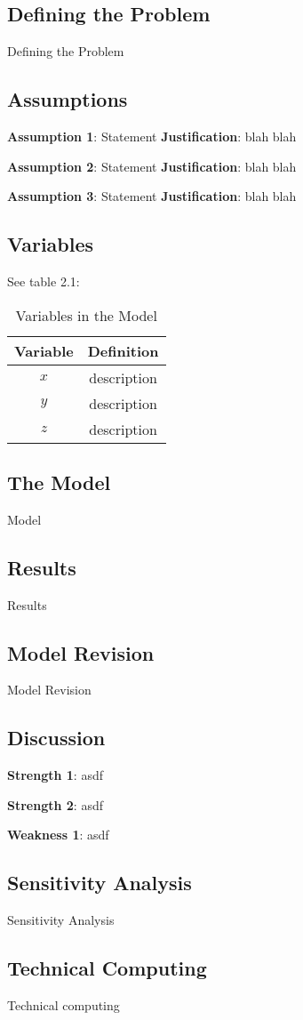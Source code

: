 \subsection{Defining the Problem}
Defining the Problem

\subsection{Assumptions}
\noindent\textbf{Assumption 1}: Statement
\textbf{Justification}: blah blah

\noindent\textbf{Assumption 2}: Statement
\textbf{Justification}: blah blah

\noindent\textbf{Assumption 3}: Statement
\textbf{Justification}: blah blah

\subsection{Variables}
See table 2.1:
\begin{table}[h!]
    \centering
    \begin{tabular}{cc}
        \toprule
        Variable & Definition      \\
        \midrule
        $x$      & description     \\
        $y$      & description     \\
        $z$      & description     \\
        \bottomrule
    \end{tabular}
    \caption{Variables in the Model}
    \label{tab:my_label}
\end{table}

\subsection{The Model}
Model

\subsection{Results}
Results

\subsection{Model Revision}
Model Revision

\subsection{Discussion}

\noindent\textbf{Strength 1}: asdf

\noindent\textbf{Strength 2}: asdf

\noindent\textbf{Weakness 1}: asdf

\subsection{Sensitivity Analysis}
Sensitivity Analysis

\subsection{Technical Computing}
Technical computing


\newpage
